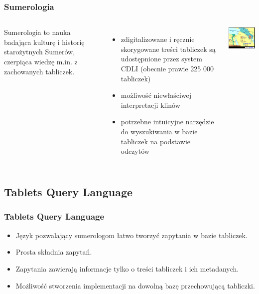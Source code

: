 \begin{frame}
\frametitle{Sumerologia}
    
\begin{columns}
Sumerologia to nauka badająca kulturę i historię starożytnych Sumerów, czerpiąca wiedzę m.in. z zachowanych tabliczek.
\begin{itemize}
\item zdigitalizowane i ręcznie skorygowane treści tabliczek są udostępnione przez system CDLI (obecnie prawie 225 000 tabliczek)
\item możliwość niewłaściwej interpretacji klinów
\item potrzebne intuicyjne narzędzie do wyszukiwania w bazie tabliczek na podstawie odczytów
\end{itemize} 

\includegraphics[width=55mm]{../1/sum_map.png}
\end{columns}


\end{frame}


\subsection{Tablets Query Language}


\begin{frame}
     \frametitle{Tablets Query Language}
     \begin{itemize}
    \item Język pozwalający sumerologom łatwo tworzyć zapytania w bazie tabliczek.\\
   \item  Prosta składnia zapytań.\\
 \item    Zapytania zawierają informacje tylko o treści tabliczek i ich metadanych.\\
  \item   Możliwość stworzenia implementacji na dowolną bazę przechowującą tabliczki.\\ %

 \end{itemize}

\end{frame}
 
